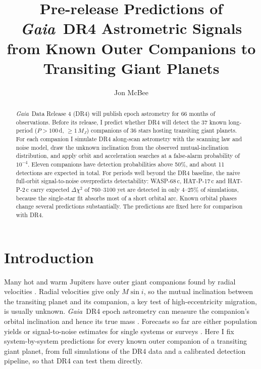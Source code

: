 \documentclass{aastex701}
\newcommand{\gaia}{\textit{Gaia}}
\begin{document}
\title{Pre-release Predictions of \gaia\ DR4 Astrometric Signals from Known Outer Companions to
Transiting Giant Planets}

\author[orcid=0009-0000-7524-4470]{Jon McBee}

\begin{abstract}
\gaia\ Data Release 4 (DR4) will publish epoch astrometry for 66 months of observations. Before
its release, I predict whether DR4 will detect the 37 known long-period ($P>100$\,d, $\geq 1\,M_J$)
companions of 36 stars hosting transiting giant planets. For each companion I simulate DR4
along-scan astrometry with the scanning law and noise model, draw the unknown inclination from
the observed mutual-inclination distribution, and apply orbit and acceleration searches at a
false-alarm probability of $10^{-4}$. Eleven companions have detection probabilities above 50\%,
and about 11 detections are expected in total. For periods well beyond the DR4 baseline, the
naive full-orbit signal-to-noise overpredicts detectability: WASP-68\,c, HAT-P-17\,c and
HAT-P-2\,c carry expected $\Delta\chi^2$ of 760--3100 yet are detected in only 4--25\% of
simulations, because the single-star fit absorbs most of a short orbital arc. Known orbital
phases change several predictions substantially. The predictions are fixed here for comparison
with DR4.
\end{abstract}


\section{Introduction}
Many hot and warm Jupiters have outer giant companions found by radial velocities
\citep{knutson2014,bryan2016}. Radial velocities give only $M\sin i$, so the mutual inclination
between the transiting planet and its companion, a key test of high-eccentricity migration, is
usually unknown. \gaia\ DR4 epoch astrometry can measure the companion's orbital inclination
and hence its true mass \citep{espinoza2023}. Forecasts so far are either population yields
\citep{espinoza2023,lammers2025} or signal-to-noise estimates for single systems or surveys
\citep{ranshaw2026,parc2026}. Here I fix system-by-system predictions for every known outer
companion of a transiting giant planet, from full simulations of the DR4 data and a calibrated
detection pipeline, so that DR4 can test them directly.
\end{document}
